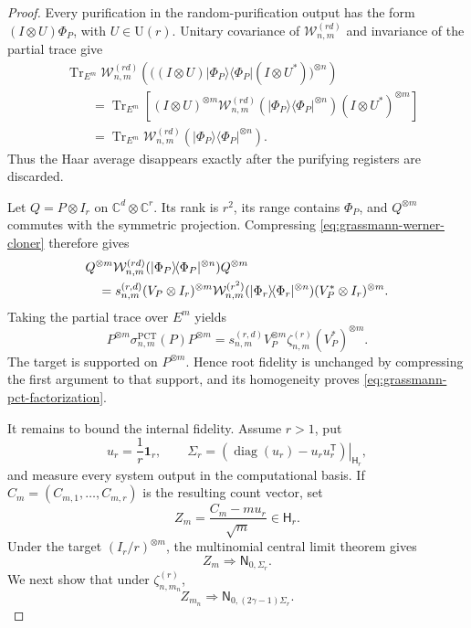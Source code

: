\documentclass[11pt]{article}
\theoremstyle{remark}
\theoremstyle{plain}
\newcommand{\C}{\mathbb C}
\newcommand{\U}{\mathrm U}
\newcommand{\diag}{\operatorname{diag}}
\newcommand{\Tr}{\operatorname{Tr}}
\newcommand{\proj}[1]{|#1\rangle\!\langle #1|}
\newcommand{\ot}{\otimes}
\begin{document}
\begin{proof}
Every purification in the random-purification output has the form
\((I\ot U)\Phi_P\), with \(U\in\U(r)\).  Unitary covariance of
\(\mathcal W_{n,m}^{(rd)}\) and invariance of the partial trace give
\begin{align*}
 &\Tr_{E^m}\mathcal W_{n,m}^{(rd)}\!\left(
   \bigl((I\ot U)\proj{\Phi_P}(I\ot U^*)\bigr)^{\ot n}
 \right)\\
 &\qquad=
 \Tr_{E^m}\!\left[
   (I\ot U)^{\ot m}
   \mathcal W_{n,m}^{(rd)}(\proj{\Phi_P}^{\ot n})
   (I\ot U^*)^{\ot m}
 \right]\\
 &\qquad=
 \Tr_{E^m}\mathcal W_{n,m}^{(rd)}(\proj{\Phi_P}^{\ot n}).
\end{align*}
Thus the Haar average disappears exactly after the purifying registers are
discarded.

Let \(Q=P\ot I_r\) on \(\C^d\ot\C^r\).  Its rank is \(r^2\), its
range contains \(\Phi_P\), and \(Q^{\ot m}\) commutes with the symmetric
projection.  Compressing \eqref{eq:grassmann-werner-cloner} therefore gives
\begin{align}
 &Q^{\ot m}\mathcal W_{n,m}^{(rd)}
   (\proj{\Phi_P}^{\ot n})Q^{\ot m}\notag\\
 &\quad=s_{n,m}^{(r,d)}
 (V_P\ot I_r)^{\ot m}
 \mathcal W_{n,m}^{(r^2)}(\proj{\Phi_r}^{\ot n})
 (V_P^*\ot I_r)^{\ot m}.
 \label{eq:grassmann-pct-purified-compression}
\end{align}
Taking the partial trace over \(E^m\) yields
\begin{equation}
  P^{\ot m}\sigma_{n,m}^{\mathrm{PCT}}(P)P^{\ot m}
  =s_{n,m}^{(r,d)}
   V_P^{\ot m}\zeta_{n,m}^{(r)}(V_P^*)^{\ot m}.
  \label{eq:grassmann-pct-system-compression}
\end{equation}
The target is supported on \(P^{\ot m}\).  Hence root fidelity is
unchanged by compressing the first argument to that support, and its
homogeneity proves \eqref{eq:grassmann-pct-factorization}.

It remains to bound the internal fidelity.  Assume \(r>1\), put
\[
  u_r=\frac1r\mathbf1_r,
  \qquad
  \Sigma_r
  =\left.(\diag(u_r)-u_ru_r^{\mathsf T})\right|_{\mathsf H_r},
\]
and measure every system output in the computational basis.  If
\(C_m=(C_{m,1},\ldots,C_{m,r})\) is the resulting count vector, set
\[
  Z_m=\frac{C_m-mu_r}{\sqrt m}\in\mathsf H_r.
\]
Under the target \((I_r/r)^{\ot m}\), the multinomial central limit theorem
gives
\begin{equation}
  Z_m\Longrightarrow\mathsf N_{0,\Sigma_r}.
  \label{eq:grassmann-target-count-limit}
\end{equation}
We next show that under \(\zeta_{n,m_n}^{(r)}\),
\begin{equation}
  Z_{m_n}\Longrightarrow
  \mathsf N_{0,(2\gamma-1)\Sigma_r}.
  \label{eq:grassmann-pct-count-limit}
\end{equation}


\end{proof}
\end{document}
